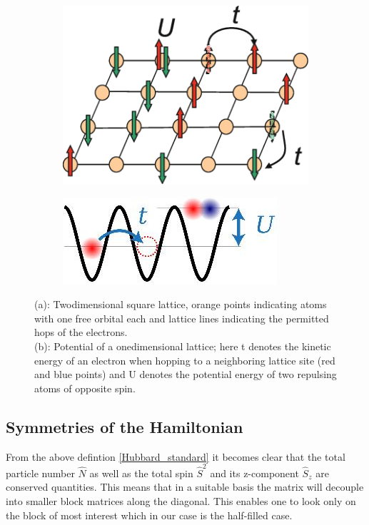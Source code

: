 \begin{figure}[h!]
	\begin{subfigure}{.5 \textwidth}
		\centering
		\includegraphics[width=0.8\linewidth]{pic2}
		\caption{\cite{Hubbard}}
		\label{fig:pic2}
	\end{subfigure}
	\begin{subfigure}{.5 \textwidth}
		\centering
		\includegraphics[width=0.8\linewidth]{pic1}
		\caption{\cite{Hubbard2}}
		\label{fig:pic1}
	\end{subfigure}
\caption[Illustration of the Hubbard model]{(a): Twodimensional square lattice, orange points indicating atoms with one free orbital each and lattice lines indicating the permitted hops of the electrons. \\(b): Potential of a onedimensional lattice; here t denotes the kinetic energy of an electron when hopping to a neighboring lattice site (red and blue points) and U denotes the potential energy of two repulsing atoms of opposite spin.}
\label{HubbardFigs}
\end{figure}



\subsection{Symmetries of the Hamiltonian}
From the above defintion \eqref{Hubbard_standard} it becomes clear that the total particle number $ \hat{N} $ as well as the total spin $ \hat{S}^2 $ and its z-component $ \hat{S}_z $ are conserved quantities. This means that in a suitable basis the matrix will decouple into smaller block matrices along the diagonal. This enables one to look only on the block of most interest which in our case is the half-filled case. \\


